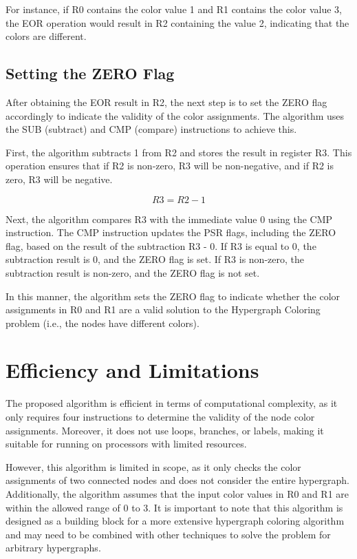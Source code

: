 For instance, if R0 contains the color value 1 and R1 contains the color value 3, the EOR operation would result in R2 containing the value 2, indicating that the colors are different.

\subsection{Setting the ZERO Flag}
After obtaining the EOR result in R2, the next step is to set the ZERO flag accordingly to indicate the validity of the color assignments. The algorithm uses the SUB (subtract) and CMP (compare) instructions to achieve this.

First, the algorithm subtracts 1 from R2 and stores the result in register R3. This operation ensures that if R2 is non-zero, R3 will be non-negative, and if R2 is zero, R3 will be negative.

\begin{equation}
R3 = R2 - 1
\end{equation}

Next, the algorithm compares R3 with the immediate value 0 using the CMP instruction. The CMP instruction updates the PSR flags, including the ZERO flag, based on the result of the subtraction R3 - 0. If R3 is equal to 0, the subtraction result is 0, and the ZERO flag is set. If R3 is non-zero, the subtraction result is non-zero, and the ZERO flag is not set.

In this manner, the algorithm sets the ZERO flag to indicate whether the color assignments in R0 and R1 are a valid solution to the Hypergraph Coloring problem (i.e., the nodes have different colors).

\section{Efficiency and Limitations}
The proposed algorithm is efficient in terms of computational complexity, as it only requires four instructions to determine the validity of the node color assignments. Moreover, it does not use loops, branches, or labels, making it suitable for running on processors with limited resources.

However, this algorithm is limited in scope, as it only checks the color assignments of two connected nodes and does not consider the entire hypergraph. Additionally, the algorithm assumes that the input color values in R0 and R1 are within the allowed range of 0 to 3. It is important to note that this algorithm is designed as a building block for a more extensive hypergraph coloring algorithm and may need to be combined with other techniques to solve the problem for arbitrary hypergraphs.

